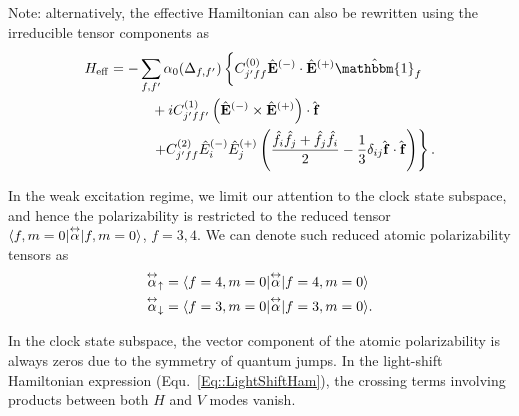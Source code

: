 Note: alternatively, the effective Hamiltonian can also be rewritten using the irreducible tensor components as
\begin{align}  
H_{\rm eff} &= - \sum_{f,f'}\alpha_0(\Delta_{f,f'}) \left\{ C_{j'ff}^{(0)} \hat{\mathbf{E}}^{(-)} \cdot \hat{\mathbf{E}}^{(+)} \hat{\mathbbm{1}}_f \phantom{\frac{\hat{1}}{1}}\right. \nonumber\\
&\quad\quad\quad + i C_{j'ff'}^{(1)} \left(\hat{\mathbf{E}}^{(-)} \times \hat{\mathbf{E}}^{(+)} \right) \cdot \hat{ \mathbf{f}} \nonumber\\
&\quad\quad\quad  \left. + C_{j'ff}^{(2)} \hat{E}_i^{(-)} \hat{E}_j^{(+)} \left( \frac{ \hat{f}_i \hat{f}_j  + \hat{f}_j \hat{f}_i  }{2} - \frac{1}{3}\delta_{ij} \hat{ \mathbf{f}} \cdot \hat{\mathbf{f}}  \right) \right\}. \label{Eq::LightShiftHam_irep}
\end{align} 

In the weak excitation regime, we limit our attention to the clock state subspace, and hence the polarizability is restricted to the reduced tensor $ \langle{f,m=0}\rvert\overset{\leftrightarrow}{\alpha}\lvert{f,m=0}\rangle$, $f=3,4 $. We can denote such reduced atomic polarizability tensors as 
\begin{align}
\overset{\leftrightarrow}{\alpha}_{\uparrow} &=\langle{f=4,m=0}\rvert\overset{\leftrightarrow}{\alpha}\lvert{f=4,m=0}\rangle\\
\overset{\leftrightarrow}{\alpha}_{\downarrow} &=\langle{f=3,m=0}\rvert\overset{\leftrightarrow}{\alpha}\lvert{f=3,m=0}\rangle.
\end{align}


In the clock state subspace, the vector component of the atomic polarizability is always zeros due to the symmetry of quantum jumps. In the light-shift Hamiltonian expression (Equ.~\eqref{Eq::LightShiftHam}), the crossing terms involving products between both $ H $ and $ V $ modes vanish. 

